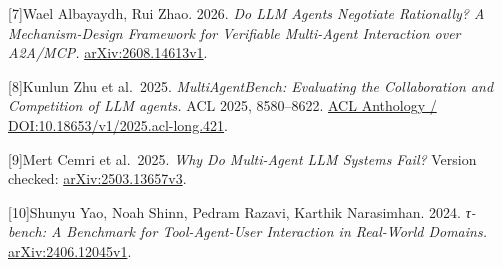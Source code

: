 \documentclass[10pt,a4paper]{article}
\begin{document}
{[}7{]}Wael Albayaydh, Rui Zhao. 2026. \emph{Do LLM Agents Negotiate Rationally? A Mechanism-Design Framework for Verifiable Multi-Agent Interaction over A2A/MCP.} \href{https://arxiv.org/pdf/2608.14613v1}{arXiv:2608.14613v1}.

{[}8{]}Kunlun Zhu et al.~2025. \emph{MultiAgentBench: Evaluating the Collaboration and Competition of LLM agents.} ACL 2025, 8580--8622. \href{https://aclanthology.org/2025.acl-long.421/}{ACL Anthology / DOI:10.18653/v1/2025.acl-long.421}.

{[}9{]}Mert Cemri et al.~2025. \emph{Why Do Multi-Agent LLM Systems Fail?} Version checked: \href{https://arxiv.org/html/2503.13657v3}{arXiv:2503.13657v3}.

{[}10{]}Shunyu Yao, Noah Shinn, Pedram Razavi, Karthik Narasimhan. 2024. \emph{τ-bench: A Benchmark for Tool-Agent-User Interaction in Real-World Domains.} \href{https://arxiv.org/html/2406.12045v1}{arXiv:2406.12045v1}.

\endgroup
\end{document}
